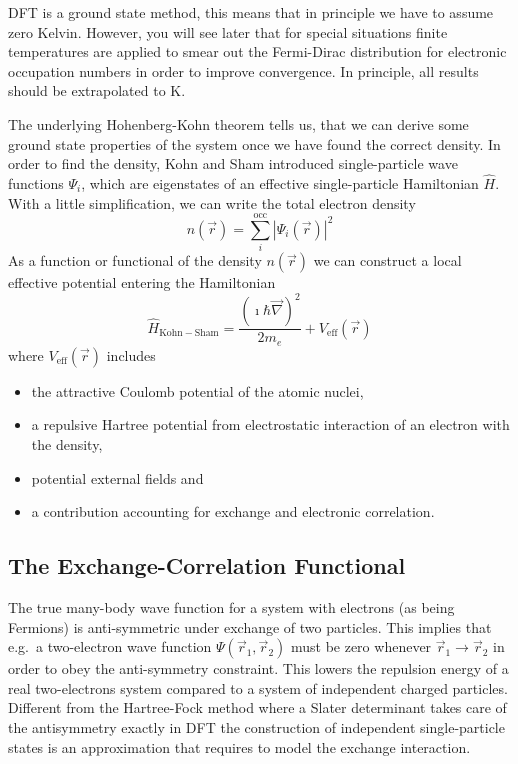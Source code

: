 \documentclass[oribibl]{llncs}
\newcommand{\um}[1]{_{\mathrm{#1}}}
\begin{document}
\ac{DFT} is a ground state method, this means that in principle we have to
assume zero Kelvin. However, you will see later that for special situations 
finite temperatures are applied to smear out the Fermi-Dirac distribution 
for electronic occupation numbers in order to improve convergence.
In principle, all results should be extrapolated to \unit[0]{K}.


The underlying Hohenberg-Kohn theorem tells us, that we can derive some 
ground state properties of the system once we have found the correct density.
In order to find the density, Kohn and Sham introduced single-particle wave functions $\Psi_i$, 
which are eigenstates of an effective single-particle Hamiltonian $\hat H$.
With a little simplification, we can write the total electron density
\begin{equation}
	n(\vec r) = \sum_i^{\mathrm{occ}} \left| \Psi_i(\vec r) \right|^2
	\label{eqn:simplified_density_generation}
\end{equation} 
As a function or functional of the density $n(\vec r)$ we can construct
a local effective potential entering the Hamiltonian
\begin{equation}
	\hat H\um{Kohn-Sham} = \frac{\left( \imath \hbar \vec \nabla \right)^2}{2 m_e} + V\um{eff}(\vec r)
	\label{eqn:Kohn-Sham_Hamiltonian_no_spin}
\end{equation} 
where $V\um{eff}(\vec r)$ includes
\begin{itemize}
  \item the attractive Coulomb potential of the atomic nuclei,
  \item a repulsive Hartree potential from electrostatic 
  		interaction of an electron with the density,
  \item potential external fields and
  \item a contribution accounting for exchange and electronic correlation.
\end{itemize}

\subsection{The Exchange-Correlation Functional} \label{sec:xc-functional}
%
The true many-body wave function for a system with electrons (as being Fermions)
is anti-symmetric under exchange of two particles. 
This implies that e.g.~a two-electron wave function $\Psi(\vec r_1,\vec r_2)$ must be zero 
whenever $\vec r_1 \rightarrow \vec r_2$ in order to obey the anti-symmetry constraint.
This lowers the repulsion energy of a real two-electrons system compared to a
system of independent charged particles.
Different from the Hartree-Fock method where a Slater determinant takes care of the antisymmetry exactly
in \ac{DFT} the construction of independent single-particle states 
is an approximation that requires to model the exchange interaction.
\end{document}
